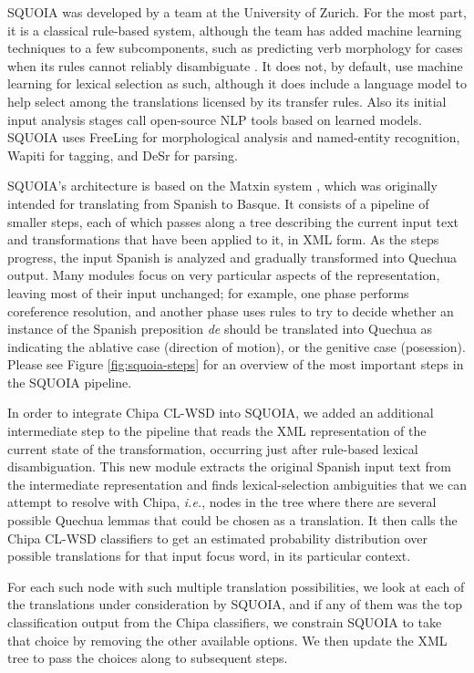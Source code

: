 SQUOIA was developed by a team at the University of Zurich. For the most part,
it is a classical rule-based system, although the team has added machine
learning techniques to a few subcomponents, such as predicting verb morphology
for cases when its rules cannot reliably disambiguate
\cite{riosgonzales-gohring:2013:HyTra}. It does not, by default, use machine
learning for lexical selection as such, although it does include a language
model to help select among the translations licensed by its transfer rules.
Also its initial input analysis stages call open-source NLP tools based on
learned models. SQUOIA uses FreeLing \cite{padro12} for morphological analysis
and named-entity recognition, Wapiti \cite{lavergne2010practical} for tagging,
and DeSr \cite{attardi-EtAl:2007:EMNLP-CoNLL2007} for parsing.

SQUOIA's architecture is based on the Matxin system \cite{matxin2005}, which
was originally intended for translating from Spanish to Basque. It consists of
a pipeline of smaller steps, each of which passes along a tree describing the
current input text and transformations that have been applied to it, in XML
form. As the steps progress, the input Spanish is analyzed and gradually
transformed into Quechua output. Many modules focus on very particular aspects
of the representation, leaving most of their input unchanged; for example, one
phase performs coreference resolution, and another phase uses rules to try to
decide whether an instance of the Spanish preposition \emph{de} should be
translated into Quechua as indicating the ablative case (direction of motion),
or the genitive case (posession). Please see Figure \ref{fig:squoia-steps} for
an overview of the most important steps in the SQUOIA pipeline.

In order to integrate Chipa CL-WSD into SQUOIA, we added an additional
intermediate step to the pipeline that reads the XML representation of the
current state of the transformation, occurring just after rule-based lexical
disambiguation. This new module extracts the original Spanish input text from
the intermediate representation and finds lexical-selection ambiguities that we
can attempt to resolve with Chipa, \emph{i.e.}, nodes in the tree where there
are several possible Quechua lemmas that could be chosen as a translation. It
then calls the Chipa CL-WSD classifiers to get an estimated probability
distribution over possible translations for that input focus word, in its
particular context.

For each such node with such multiple translation possibilities, we look at
each of the translations under consideration by SQUOIA, and if any of them was
the top classification output from the Chipa classifiers, we constrain SQUOIA
to take that choice by removing the other available options.
We then update the XML tree to pass the choices along to subsequent steps.

